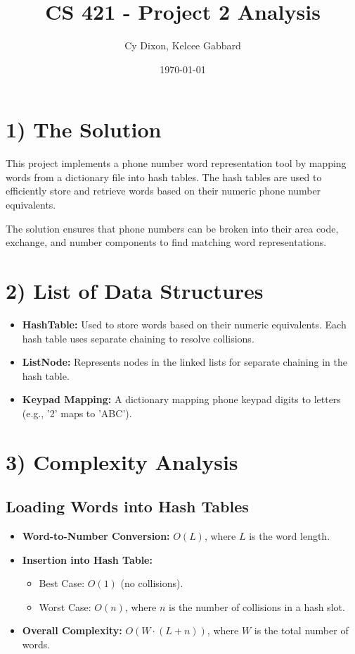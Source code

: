 \documentclass{article}
\author{Cy Dixon, Kelcee Gabbard}
\title{CS 421 - Project 2 Analysis}
\date{\today}
\begin{document}
\maketitle

\thispagestyle{fancy}

\section*{1) The Solution}
This project implements a phone number word representation tool by mapping words from a dictionary file into hash tables. The hash tables are used to efficiently store and retrieve words based on their numeric phone number equivalents. 

The solution ensures that phone numbers can be broken into their area code, exchange, and number components to find matching word representations.

\section*{2) List of Data Structures}
\begin{itemize}
    \item \textbf{HashTable:} Used to store words based on their numeric equivalents. Each hash table uses separate chaining to resolve collisions.
    \item \textbf{ListNode:} Represents nodes in the linked lists for separate chaining in the hash table.
    \item \textbf{Keypad Mapping:} A dictionary mapping phone keypad digits to letters (e.g., '2' maps to 'ABC').
\end{itemize}

\section*{3) Complexity Analysis}
\subsection*{Loading Words into Hash Tables}
\begin{itemize}
    \item \textbf{Word-to-Number Conversion:} \(O(L)\), where \(L\) is the word length.
    \item \textbf{Insertion into Hash Table:}
        \begin{itemize}
            \item Best Case: \(O(1)\) (no collisions).
            \item Worst Case: \(O(n)\), where \(n\) is the number of collisions in a hash slot.
        \end{itemize}
    \item \textbf{Overall Complexity:} \(O(W \cdot (L + n))\), where \(W\) is the total number of words.
\end{itemize}
\end{document}

